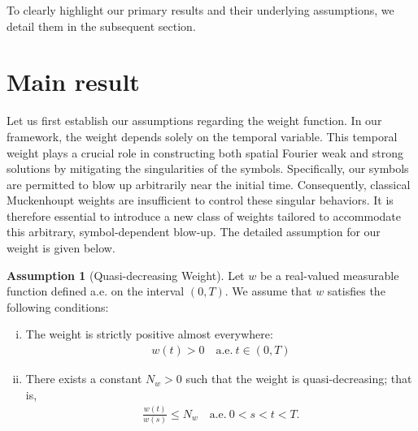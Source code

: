 \documentclass[11pt,reqno]{amsart}
\theoremstyle{definition}
\newtheorem{assumption}[thm]{Assumption}
\theoremstyle{remark}
\numberwithin{equation}{section}
\newcommand{\mysection}[1]{\section{#1}}
\begin{document}
To clearly highlight our primary results and their underlying assumptions, we detail them in the subsequent section.

\mysection{Main result}



Let us first establish our assumptions regarding the weight function. 
In our framework, the weight depends solely on the temporal variable. 
This temporal weight plays a crucial role in constructing both spatial Fourier weak and strong solutions by mitigating the singularities of the symbols. 
Specifically, our symbols are permitted to blow up arbitrarily near the initial time. 
Consequently, classical Muckenhoupt weights are insufficient to control these singular behaviors. 
It is therefore essential to introduce a new class of weights tailored to accommodate this arbitrary, symbol-dependent blow-up. The detailed assumption for our weight is given below.

\begin{assumption}[Quasi-decreasing Weight]
										\label{weight as}
Let $w$ be a real-valued measurable function defined a.e. on the interval $(0,T)$. We assume that $w$ satisfies the following conditions:
\begin{enumerate}[(i)]
\item The weight is strictly positive almost everywhere:
\begin{align*}
w(t) >0 \quad \text{a.e.}~ t \in (0,T)
\end{align*}
\item There exists a constant $N_w > 0$ such that the weight is quasi-decreasing; that is,
\begin{align*}
\frac{w(t)}{w(s)} \leq N_w \quad \text{a.e.}~ 0<s<t<T.
\end{align*}
\end{enumerate}
\end{assumption}
\end{document}
